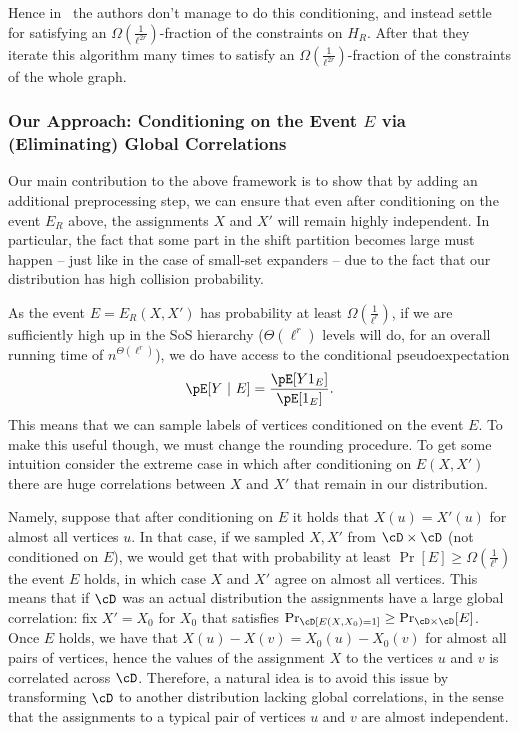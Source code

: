 Hence in~\cite{BBKSS} the authors don't manage to do this conditioning, and instead settle 
for satisfying an $\Omega\left(\frac{1}{\ell^{2r}}\right)$-fraction of the constraints on $H_R$. After that they iterate this algorithm many times to satisfy an $\Omega\left(\frac{1}{\ell^{2r}}\right)$-fraction of the constraints of the whole graph. 


\subsubsection{Our Approach: Conditioning on the Event $E$ via
(Eliminating) Global Correlations}
Our main contribution to the 
above framework is to show 
that by adding an additional preprocessing step, we can ensure that even after conditioning on the event $E_R$ 
above, the assignments $X$ and 
$X'$ will remain highly 
independent. In particular, 
the fact that some part in
the shift partition becomes
large must happen -- just like
in the case of small-set expanders -- due to the fact
that our distribution has high collision probability.

As the event $E = E_R(X,X')$ has 
probability at least $\Omega\left(\frac{1}{\ell^r}\right)$, 
 if we are sufficiently high up in the SoS hierarchy 
($\Theta(\ell^r)$ levels will do, for an overall running time of 
$n^{\Theta(\ell^r)}$), we do have access to the conditional pseudoexpectation
\[
\pE[Y~|~E] = \frac{\pE[Y 1_E]}{\pE[1_E]}.
\]
This means that we can sample labels of vertices 
conditioned on the event $E$. To make this useful though, we must change the 
rounding procedure. 
To get some intuition consider 
the extreme case in which after conditioning on $E(X,X')$ 
there are huge correlations between $X$
and $X'$ that remain in our distribution. 

Namely, suppose that after conditioning on $E$ it holds that $X(u) = X'(u)$ for almost all vertices $u$. 
In that case, if we sampled 
$X,X'$ from $\cD \times \cD$ (not conditioned on $E$), we would get that with probability 
at least $\Pr[E]\geq \Omega\left(\frac{1}{\ell^r}\right)$
the event $E$ holds, in which case $X$ and $X'$ agree on almost all vertices. This means that if $\cD$ was an actual distribution the assignments have a large global correlation: fix $X' = X_0$ for $X_0$ that satisfies $\Pr_\cD[E(X,X_0) = 1] \geq \Pr_{\cD \times \cD}[E]$. Once $E$ holds, 
we have that $X(u) - X(v) = X_0(u) - X_0(v)$ for almost all pairs of vertices, hence the values of the assignment $X$ to the vertices $u$ and $v$ is correlated across $\cD$.
Therefore, a natural idea is to avoid this issue by transforming $\cD$ to another distribution lacking global correlations, in the sense that the assignments to a typical pair of vertices $u$ and $v$ are almost independent. 


